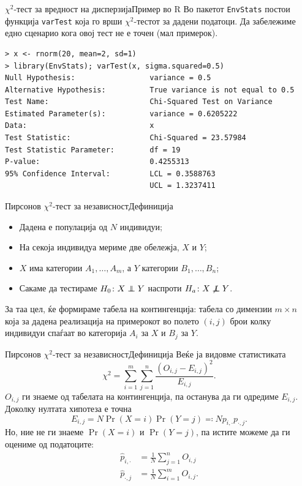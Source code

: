 \documentclass[hyperref={unicode}, xcolor={svgnames, table},
usepdftitle=false]{beamer}
\newcommand\independent{\protect\mathpalette{\protect\independenT}{\perp}}
\def\independenT#1#2{\mathrel{\rlap{$#1#2$}\mkern2mu{#1#2}}}
\theoremstyle{remark}
\begin{document}
\begin{frame}[fragile]{\(\chi^2\)-тест за вредност на дисперзија}{Пример во R}
  Во пакетот \texttt{EnvStats} постои функција \texttt{varTest}
  која го врши \(\chi^2\)-тестот за дадени податоци.  Да забележиме едно
  сценарио кога овој тест не е точен (мал примерок).
\begin{verbatim}
> x <- rnorm(20, mean=2, sd=1)
> library(EnvStats); varTest(x, sigma.squared=0.5)
Null Hypothesis:                 variance = 0.5
Alternative Hypothesis:          True variance is not equal to 0.5
Test Name:                       Chi-Squared Test on Variance
Estimated Parameter(s):          variance = 0.6205222
Data:                            x
Test Statistic:                  Chi-Squared = 23.57984
Test Statistic Parameter:        df = 19
P-value:                         0.4255313
95% Confidence Interval:         LCL = 0.3588763
                                 UCL = 1.3237411
\end{verbatim}
\end{frame}

\begin{frame}{Пирсонов \(\chi^2\)-тест за независност}{Дефиниција}
  \begin{itemize}
  \item Дадена е популација од \(N\) индивидуи;
  \item На секоја индивидуа мериме две обележја, \(X\) и \(Y\);
  \item \(X\) има категории \(A_1, \ldots, A_m\), а \(Y\) категории
    \(B_1, \ldots, B_n\);
  \item Сакаме да тестираме \(H_0 \colon X \independent Y\) наспроти
    \(H_a \colon X \not\independent Y\).
  \end{itemize}
  За таа цел, ќе формираме табела на контингенција: табела со димензии
  \(m \times n\) која за дадена реализација на примерокот во полето \((i, j)\)
  брои колку индивидуи спаѓаат во категорија \(A_i\) за \(X\) и \(B_j\) за
  \(Y\).
\end{frame}

\begin{frame}{Пирсонов \(\chi^2\)-тест за независност}{Дефиниција}
  Веќе ја видовме статистиката
  \[
    \chi^2 = \sum\limits_{i = 1}^{m} \sum\limits_{j = 1}^{n} \frac{(O_{i, j} -
      E_{i, j})^2}{E_{i, j}}\text{.}
  \]
  \(O_{i, j}\) ги знаеме од табелата на контингенција, па останува да ги
  одредиме \(E_{i, j}\).  Доколку нултата хипотеза е точна
  \[
    E_{i, j} = N \Pr(X = i) \Pr(Y = j) \eqqcolon N p_{i, \cdot} p_{\cdot, j}\text{.}
  \]
  Но, ние не ги знаеме \(\Pr(X = i)\) и \(\Pr(Y = j)\), па истите можеме да ги
  оцениме од податоците:
  \begin{align*}
    \hat{p}_{i, \cdot} &= \frac{1}{N} \sum_{j = 1}^{n} O_{i, j} \\
    \hat{p}_{\cdot, j} &= \frac{1}{N} \sum_{i = 1}^{m} O_{i, j}\text{.}
  \end{align*}
\end{frame}
\end{document}

